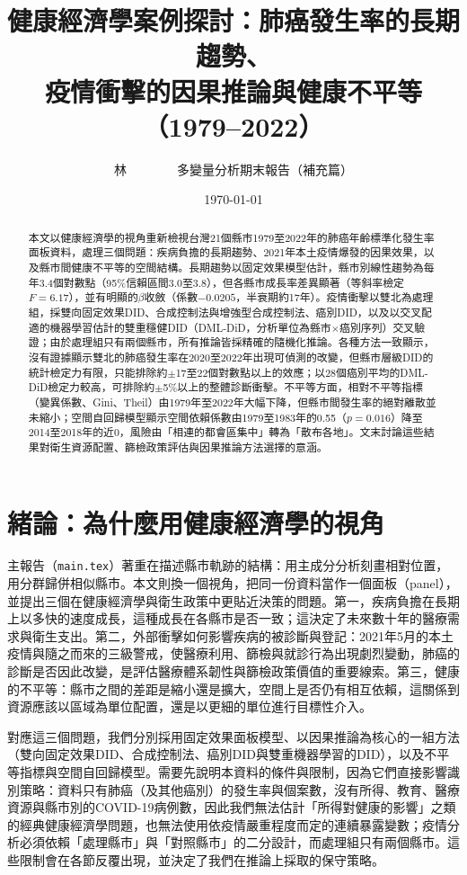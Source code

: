 \documentclass[UTF8,a4paper,11pt]{ctexart}
\title{健康經濟學案例探討：肺癌發生率的長期趨勢、\\疫情衝擊的因果推論與健康不平等（1979--2022）}
\author{林\ \ \ \ \ \ \ \ 多變量分析期末報告（補充篇）}
\date{\today}
\begin{document}
\maketitle

\begin{abstract}
\noindent
本文以健康經濟學的視角重新檢視台灣21個縣市1979至2022年的肺癌年齡標準化發生率面板資料，處理三個問題：疾病負擔的長期趨勢、2021年本土疫情爆發的因果效果，以及縣市間健康不平等的空間結構。長期趨勢以固定效果模型估計，縣市別線性趨勢為每年3.4個對數點（95\%信賴區間3.0至3.8），但各縣市成長率差異顯著（等斜率檢定 $F=6.17$），並有明顯的$\beta$收斂（係數$-0.0205$，半衰期約17年）。疫情衝擊以雙北為處理組，採雙向固定效果DID、合成控制法與增強型合成控制法、癌別DID，以及以交叉配適的機器學習估計的雙重穩健DID（DML-DiD，分析單位為縣市$\times$癌別序列）交叉驗證；由於處理組只有兩個縣市，所有推論皆採精確的隨機化推論。各種方法一致顯示，沒有證據顯示雙北的肺癌發生率在2020至2022年出現可偵測的改變，但縣市層級DID的統計檢定力有限，只能排除約$\pm$17至22個對數點以上的效應；以28個癌別平均的DML-DiD檢定力較高，可排除約$\pm$5\%以上的整體診斷衝擊。不平等方面，相對不平等指標（變異係數、Gini、Theil）由1979年至2022年大幅下降，但縣市間發生率的絕對離散並未縮小；空間自回歸模型顯示空間依賴係數由1979至1983年的0.55（$p=0.016$）降至2014至2018年的近0，風險由「相連的都會區集中」轉為「散布各地」。文末討論這些結果對衛生資源配置、篩檢政策評估與因果推論方法選擇的意涵。
\end{abstract}

\tableofcontents
\newpage

\section{緒論：為什麼用健康經濟學的視角}
主報告（\texttt{main.tex}）著重在描述縣市軌跡的結構：用主成分分析刻畫相對位置，用分群歸併相似縣市。本文則換一個視角，把同一份資料當作一個面板（panel），並提出三個在健康經濟學與衛生政策中更貼近決策的問題。第一，疾病負擔在長期上以多快的速度成長，這種成長在各縣市是否一致；這決定了未來數十年的醫療需求與衛生支出。第二，外部衝擊如何影響疾病的被診斷與登記：2021年5月的本土疫情與隨之而來的三級警戒，使醫療利用、篩檢與就診行為出現劇烈變動，肺癌的診斷是否因此改變，是評估醫療體系韌性與篩檢政策價值的重要線索。第三，健康的不平等：縣市之間的差距是縮小還是擴大，空間上是否仍有相互依賴，這關係到資源應該以區域為單位配置，還是以更細的單位進行目標性介入。

對應這三個問題，我們分別採用固定效果面板模型、以因果推論為核心的一組方法（雙向固定效果DID、合成控制法、癌別DID與雙重機器學習的DID），以及不平等指標與空間自回歸模型。需要先說明本資料的條件與限制，因為它們直接影響識別策略：資料只有肺癌（及其他癌別）的發生率與個案數，沒有所得、教育、醫療資源與縣市別的COVID-19病例數，因此我們無法估計「所得對健康的影響」之類的經典健康經濟學問題，也無法使用依疫情嚴重程度而定的連續暴露變數；疫情分析必須依賴「處理縣市」與「對照縣市」的二分設計，而處理組只有兩個縣市。這些限制會在各節反覆出現，並決定了我們在推論上採取的保守策略。
\end{document}
